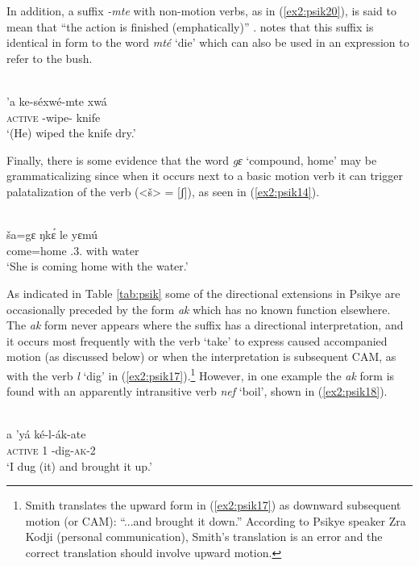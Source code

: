 In addition, a suffix \textit{-mte} with non-motion verbs, as in (\ref{ex2:psik20}), is said to mean that ``the action is finished (emphatically)'' \citep[114, 163]{smithKapsikiLanguage1969}. \citet[163]{smithKapsikiLanguage1969} notes that this suffix is identical in form to the word \textit{mté} `die' which can also be used in an expression to refer to the bush.  

\ea\label{ex2:psik20}
 \\
\gll 'a ke-séxwé-mte xwá	\\
\textsc{active} -wipe- knife	\\
\glt `(He) wiped the knife dry.'
\z 

Finally, there is some evidence that the word \textit{gɛ} `compound, home' may be grammaticalizing since when it occurs next to a basic motion verb it can trigger palatalization of the verb (<š> = [ʃ]), as seen in (\ref{ex2:psik14}).

\ea\label{ex2:psik14}
 \\
\gll ša=gɛ ŋkɛ́ le yɛmú \\
come=home .3. with water	\\
\glt `She is coming home with the water.'
\z 

As indicated in Table \ref{tab:psik} some of the directional extensions in Psikye are occasionally preceded by the form \textit{ak} which has no known function elsewhere. The \textit{ak} form never appears where the suffix has a directional interpretation, and it occurs most frequently with the verb `take' to express caused accompanied motion (as discussed below) or when the interpretation is subsequent CAM, as with the verb \textit{l} `dig' in (\ref{ex2:psik17}).\footnote{Smith translates the upward form in (\ref{ex2:psik17}) as downward subsequent motion (or CAM): ``...and brought it down.'' According to Psikye speaker Zra Kodji (personal communication), Smith's translation is an error and the correct translation should involve upward motion.} However, in one example the \textit{ak} form is found with an apparently intransitive verb \textit{nef} `boil', shown in (\ref{ex2:psik18}).

\ea\label{ex2:psik17}
 \\
\gll a 'yá ké-l-ák-ate \\
\textsc{active} 1 -dig-\textsc{ak}-2	\\
\glt `I dug (it) and brought it up.'


